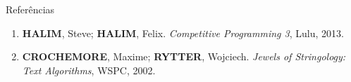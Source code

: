 \begin{frame}[fragile]{Referências}

    \begin{enumerate}
        \item \textbf{HALIM}, Steve; \textbf{HALIM}, Felix. \textit{Competitive Programming 3}, Lulu, 2013.

        \item \textbf{CROCHEMORE}, Maxime; \textbf{RYTTER}, Wojciech. \textit{Jewels of Stringology: Text Algorithms}, WSPC, 2002.

    \end{enumerate}

\end{frame}
